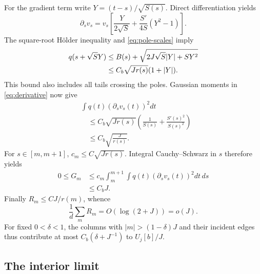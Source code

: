 \documentclass[aps,pra,reprint,superscriptaddress,longbibliography]{revtex4-2}
\theoremstyle{remark}
\begin{document}
For the gradient term write $Y=(t-s)/\sqrt{S(s)}$. Direct
differentiation yields
\begin{equation}
 \partial_sv_s=v_s\left[\frac{Y}{2\sqrt S}
 +\frac{S'}{4S}(Y^2-1)\right].
 \label{eq:derivative}
\end{equation}
The square-root H\"older inequality and \eqref{eq:pole-scales}
imply
\begin{align}
 q(s+\sqrt S Y)
 &\leq B(s)+\sqrt{2J\sqrt S|Y|+SY^2}\notag\\
 &\leq C_b\sqrt{Jr(s)}(1+|Y|).
 \label{eq:q-bound}
\end{align}
This bound also includes all tails crossing the poles. Gaussian
moments in \eqref{eq:derivative} now give
\begin{equation}
\begin{aligned}
&\int q(t)(\partial_sv_s(t))^2dt\\
&\quad\leq C_b\sqrt{Jr(s)}
\left(\frac1{S(s)}+\frac{S'(s)^2}{S(s)^2}\right)\\
&\quad\leq C_b\sqrt{\frac J{r(s)}}.
\end{aligned}
\label{eq:derivative-bound}
\end{equation}
For $s\in[m,m+1]$, $c_m\leq C\sqrt{Jr(s)}$. Integral
Cauchy--Schwarz in $s$ therefore yields
\begin{equation}
\begin{aligned}
0\leq G_m
&\leq c_m\int_m^{m+1}\int q(t)(\partial_sv_s(t))^2dt\,ds\\
&\leq C_bJ.
\end{aligned}
\label{eq:G-bound}
\end{equation}
Finally $R_m\leq CJ/r(m)$, whence
\begin{equation}
 \frac1d\sum_mR_m=O(\log(2+J))=o(J).
 \label{eq:R-bound}
\end{equation}
For fixed $0<\delta<1$, the columns with
$|m|>(1-\delta)J$ and their incident edges thus contribute at most
$C_b(\delta+J^{-1})$ to $U_j[b]/J$.

\subsection{The interior limit}
\end{document}
